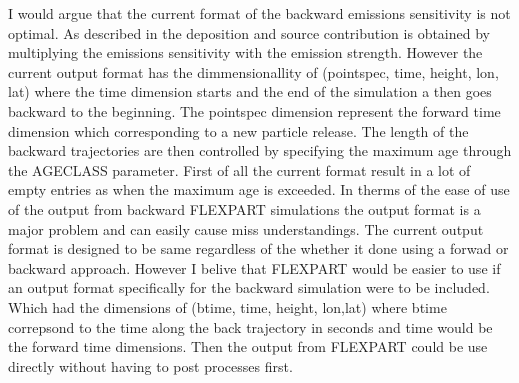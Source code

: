I would argue that the current format of the backward emissions sensitivity is not optimal. As described in  the deposition and source contribution is obtained by multiplying the emissions sensitivity with the emission strength. However the current output format has the dimmensionallity of (pointspec, time, height, lon, lat) where the time dimension starts and the end of the simulation a  then goes backward to the beginning. The pointspec dimension represent the forward time dimension which corresponding to a new particle release. The length of the backward trajectories are then controlled by specifying the maximum age through the AGECLASS parameter. First of all the current format result in a lot of empty entries as when the maximum age is exceeded. In therms of the ease of use of the output from backward FLEXPART simulations the output format is a major problem and can easily cause miss understandings. The current output format is designed to be same regardless of the whether it done using a forwad or backward approach. However I belive that FLEXPART would be easier to use if an output format specifically for the backward simulation were to be included. Which had the dimensions of (btime, time, height, lon,lat) where btime correpsond to the time along the back trajectory in seconds and time would be the forward time dimensions. Then the output from FLEXPART could be use directly without having to post processes first. 
